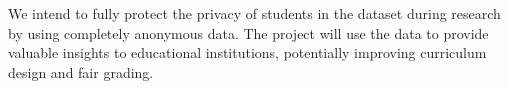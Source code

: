 \documentclass[12pt]{article}
\begin{document}
We intend to fully protect the privacy of students 
in the dataset during research by using completely anonymous data.
The project will use the data to provide valuable insights to 
educational institutions, 
potentially improving curriculum design and fair grading.





\end{document}
